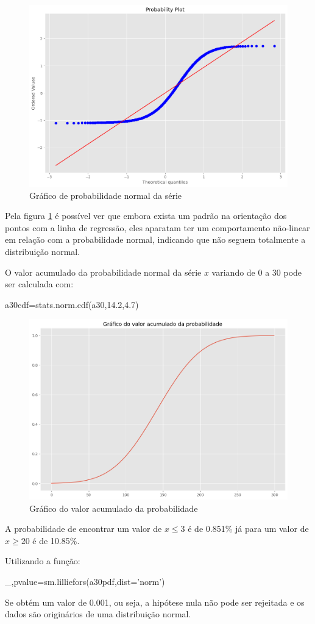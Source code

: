 \documentclass[12pt,a4paper,portuguese]{article}
\begin{document}
\begin{figure}[H]
	\centering
	\includegraphics[width=0.9\linewidth]{lista1-3.3d}
	\caption{Gráfico de probabilidade normal da série}
	\label{lista1-3.3d}
\end{figure}
Pela figura \ref{lista1-3.3d} é possível ver que embora exista um padrão na orientação dos pontos com a linha de regressão, eles aparatam ter um comportamento não-linear em relação com a probabilidade normal, indicando que não seguem totalmente a distribuição normal. 

O valor acumulado da probabilidade normal da série $x$ variando de 0 a 30 pode ser calculada com:
\begin{python}
	a30cdf=stats.norm.cdf(a30,14.2,4.7)
\end{python}
\begin{figure}[H]
	\centering
	\includegraphics[width=0.9\linewidth]{lista1-3.3f}
	\caption{Gráfico do valor acumulado da probabilidade}
	\label{fig:lista1-3.3f}
\end{figure}
A probabilidade de encontrar um valor de $x\leq 3$ é de 0.851\% já para um valor de $x\geq 20$ é de 10.85\%. 

Utilizando a função:
\begin{python}
_,pvalue=sm.lilliefors(a30pdf,dist='norm')
\end{python}
Se obtém um valor de 0.001, ou seja, a hipótese nula não pode ser rejeitada e os dados são originários de uma distribuição normal.
\end{document}
